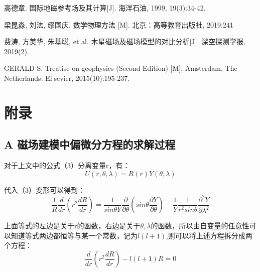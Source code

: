 \documentclass{article}
\begin{document}
      \begin{thebibliography}{1}
             \bibitem{}

       高德章. 国际地磁参考场及其计算[J]. 海洋石油, 1999, 19(3):34-42.
 
       
        \bibitem{}
        梁昆淼, 刘法, 缪国庆. 数学物理方法 [M]. 北京：高等教育出版社, 2019:241
        

        \bibitem{}

        费涛, 方美华, 朱基聪, et al. 木星磁场及磁场模型的对比分析[J]. 深空探测学报, 2019(2).





 
 
        
        \bibitem{}
        
        GERALD S. Treatise on geophysics (Second Edition) [M]. Amsterdam, The Netherlands: Elsevier, 2015(10):195-237.


        \end{thebibliography}




\section*{附录}

\subsection*{A 磁场建模中偏微分方程的求解过程}

对于上文中的公式（3）分离变量r，有：
     \begin{equation} 
      U(r,\theta,\lambda) = R(r)Y(\theta, \lambda)
   \end{equation}
   
代入（3）变形可以得到：
\begin{equation} 
      \frac{1}{R}\frac{d}{dr}(r^2\frac{dR}{dr}) = \frac{1}{sin\theta{Y}}\frac{\partial}{\partial\theta}(sin\theta\frac{\partial{Y}}{\partial{\theta}})-\frac{1}{Y}\frac{1}{r^2sin\theta}\frac{\partial^2Y}{\partial\lambda^2}   
   \end{equation}
   
 上面等式的左边是关于r的函数，右边是关于$\theta,\lambda$的函数，所以由自变量的任意性可以知道等式两边都恒等与某一个常数，记为$l(l+1)$,则可以将上述方程拆分成两个方程：
 \begin{equation}
         \frac{d}{dr}(r^2\frac{dR}{dr})-l(l+1)R=0      
 \end{equation}
 
\end{document}
